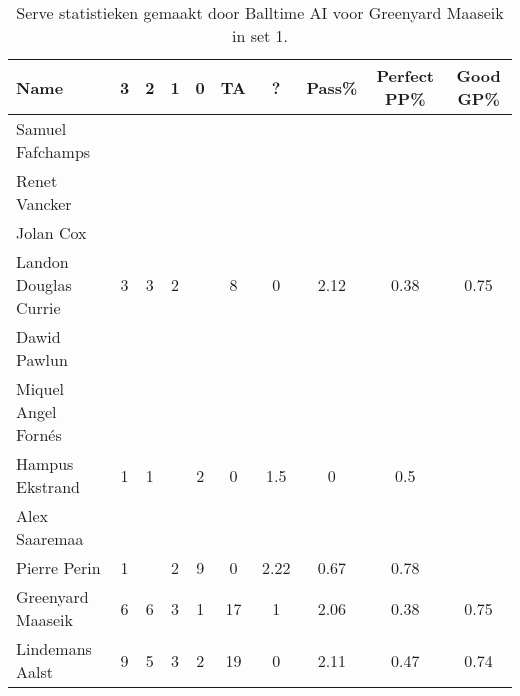 \begin{table}[ht!]
  \centering
  \scriptsize
  \begin{tabular}{|l|c|c|c|c|c|c|c|c|c|} \hline
    \textbf{Name} & 3 & 2 & 1 & 0 & TA & ? & Pass\% & Perfect PP\% & Good GP\% \\ \hline
    Samuel Fafchamps &   &   &   &   &   &   &   &   &   \\
    Renet Vancker &   &   &   &   &   &   &   &   &   \\
    Jolan Cox &   &   &   &   &   &   &   &   &   \\
    Landon Douglas Currie & 3 & 3 & 2 &   & 8 & 0 & 2.12 & 0.38 & 0.75 \\
    Dawid Pawlun &   &   &   &   &   &   &   &   &   \\
    Miquel Angel Fornés &   &   &   &   &   &   &   &   &   \\
    Hampus Ekstrand & 1 & 1 &   & 2 & 0 & 1.5 & 0 & 0.5 &   \\
    Alex Saaremaa &   &   &   &   &   &   &   &   &   \\
    Pierre Perin & 1 &   & 2 & 9 & 0 & 2.22 & 0.67 & 0.78 &   \\
    Greenyard Maaseik & 6 & 6 & 3 & 1 & 17 & 1 & 2.06 & 0.38 & 0.75 \\
    Lindemans Aalst & 9 & 5 & 3 & 2 & 19 & 0 & 2.11 & 0.47 & 0.74 \\ \hline
  \end{tabular}
  \caption[Receive statistieken gemaakt door Balltime AI voor Greenyard Maaseik in set 1]{\label{tab:PL3ReceiveMaaseik1}Serve statistieken gemaakt door Balltime AI voor Greenyard Maaseik in set 1.}
\end{table}

